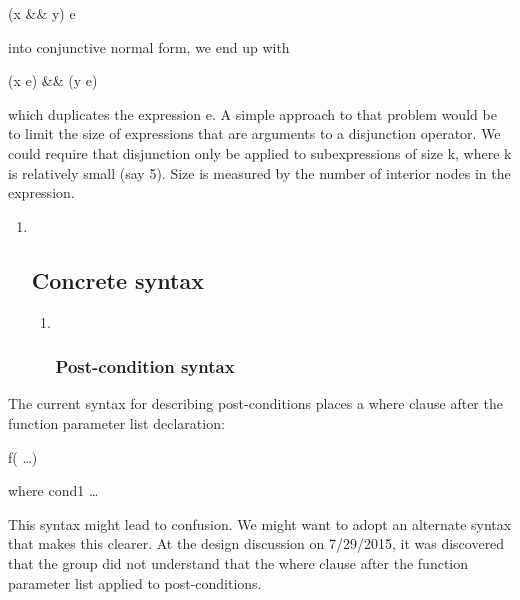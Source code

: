 \documentclass[]{article}
\begin{document}
(x \&\& y) \textbar{}\textbar{} e

into conjunctive normal form, we end up with

(x \textbar{}\textbar{} e) \&\& (y \textbar{}\textbar{} e)

which duplicates the expression e. A simple approach to that problem
would be to limit the size of expressions that are arguments to a
disjunction operator. We could require that disjunction only be applied
to subexpressions of size k, where k is relatively small (say 5). Size
is measured by the number of interior nodes in the expression.

\begin{enumerate}
\def\labelenumi{\arabic{enumi}.}
\item ~
  \subsection{\texorpdfstring{\protect\hypertarget{ux5fToc422907006}{}{\protect\hypertarget{ux5fToc424307735}{}{\protect\hypertarget{ux5fToc426641136}{}{\protect\hypertarget{ux5fToc435435011}{}{\protect\hypertarget{ux5fToc437460845}{}{\protect\hypertarget{ux5fToc440445526}{}{\protect\hypertarget{ux5fToc440449308}{}{\protect\hypertarget{ux5fToc440551958}{}{}}}}}}}}Concrete
  syntax}{Concrete syntax}}\label{concrete-syntax}

  \begin{enumerate}
  \def\labelenumii{\arabic{enumii}.}
  \item ~
    \subsubsection{\texorpdfstring{\protect\hypertarget{ux5fToc426641137}{}{\protect\hypertarget{ux5fToc435435012}{}{\protect\hypertarget{ux5fToc437460846}{}{\protect\hypertarget{ux5fToc440445527}{}{\protect\hypertarget{ux5fToc440449309}{}{\protect\hypertarget{ux5fToc440551959}{}{}}}}}}Post-condition
    syntax}{Post-condition syntax}}\label{post-condition-syntax}
  \end{enumerate}
\end{enumerate}

The current syntax for describing post-conditions places a where clause
after the function parameter list declaration:

f( \ldots{})

where cond1 \ldots{}

This syntax might lead to confusion. We might want to adopt an alternate
syntax that makes this clearer. At the design discussion on 7/29/2015,
it was discovered that the group did not understand that the where
clause after the function parameter list applied to post-conditions.
\end{document}
